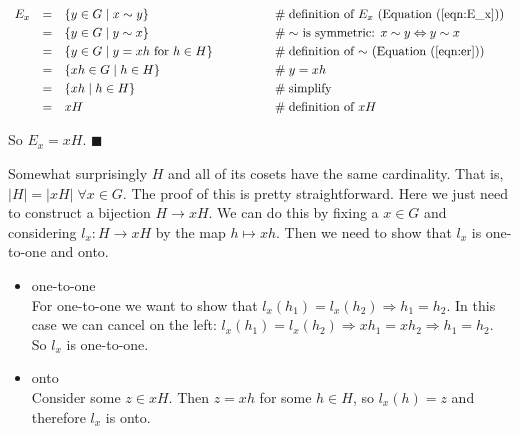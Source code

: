 \documentclass{article}
\theoremstyle{definition}
\begin{document}
\begin{equation*}
\begin{array}{llll}
E_x
&=& \{y \in G \mid x \sim y\}                           &\hspace{4em} \mathrel{\#} \text{definition of $E_x$ (Equation (\ref{eqn:E_x}))} \\
[3pt]
&=& \{y \in G \mid y \sim x\}                           &\hspace{4em} \mathrel{\#} \text{$\sim$ is symmetric:
															$x\sim y \Leftrightarrow y\sim x$} \\
[3pt]
&=& \{y \in G \mid y = xh \text{ for } h \in H\}		&\hspace{4em} \mathrel{\#} \text{definition of $\sim$ 
															(Equation (\ref{eqn:er}))} \\
[3pt]
&=& \{xh \in G \mid h \in H\}							&\hspace{4em} \mathrel{\#} y = xh \\
[3pt]
&=& \{xh \mid h \in H\}                                 &\hspace{4em} \mathrel{\#} \text{simplify} \\
[3pt]
&=& xH                                                  &\hspace{4em} \mathrel{\#} \text{definition of $xH$}\\
\end{array}
\end{equation*}

\smallskip
\noindent
So $E_x = xH$. $\blacksquare$

\bigskip
\noindent
Somewhat surprisingly $H$ and all of its cosets have the same
cardinality. That is, $|H| = |xH|\; \forall x \in G$.  The proof
of this is pretty straightforward. Here we just need to construct
a bijection $H \rightarrow xH$. We can do this by fixing a $x \in
G$ and considering $l_x: H \rightarrow xH$ by the map $h \mapsto
xh$. Then we need to show that $l_x$ is one-to-one and onto.

\begin{itemize}
\item one-to-one \\
For one-to-one we want to show that
$l_x(h_1) = l_x(h_2) \Rightarrow h_1 = h_2$. In this case we can
cancel on the left: $l_x(h_1) = l_x(h_2) \Rightarrow xh_1 = xh_2
\Rightarrow h_1 = h_2$.  So $l_x$ is one-to-one.
\item onto \\
Consider some $z \in xH$. Then $z = xh$ for some $h \in H$, so
$l_x(h) = z$ and therefore $l_x$ is onto. 
\end{itemize}
\end{document}
